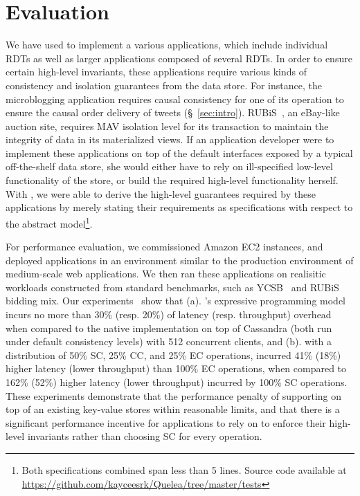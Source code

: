 \section{Evaluation}
\label{sec:evaluation}

We have used \name to implement a various applications, which include
individual RDTs as well as larger applications composed of several
RDTs. In order to ensure certain high-level invariants, these
applications require various kinds of consistency and isolation
guarantees from the data store. For instance, the microblogging
application requires causal consistency for one of its 
operation to ensure the causal order delivery of tweets
(\S~\ref{sec:intro}). RUBiS~\cite{RUBiS}, an eBay-like auction site,
requires MAV isolation level for its  transaction to
maintain the integrity of data in its materialized views. If an
application developer were to implement these applications on top of
the default interfaces exposed by a typical off-the-shelf data store,
she would either have to rely on ill-specified low-level functionality
of the store, or build the required high-level functionality herself.
With \name, we were able to derive the high-level guarantees required
by these applications by merely stating their requirements as
specifications with respect to the abstract model\footnote{Both
specifications combined span less than 5 lines. Source code available
at \url{https://github.com/kayceesrk/Quelea/tree/master/tests}}.

For performance evaluation, we commissioned Amazon EC2 instances, and
deployed \name applications in an environment similar to the
production environment of medium-scale web applications. We then ran
these applications on realisitic workloads constructed from standard
benchmarks, such as YCSB~\cite{YCSB} and RUBiS bidding mix. Our
experiments~\cite{pldi15} show that (a). \name's expressive
programming model incurs no more than 30\% (resp. 20\%) of latency
(resp. throughput) overhead when compared to the native implementation
on top of Cassandra (both run under default consistency levels) with
512 concurrent clients, and (b). with a distribution of 50\% SC, 25\%
CC, and 25\% EC operations, \name incurred 41\% (18\%) higher latency
(lower throughput) than 100\% EC operations, when compared to 162\%
(52\%) higher latency (lower throughput) incurred by 100\% SC
operations. These experiments demonstrate that the performance penalty
of supporting \name on top of an existing key-value stores within
reasonable limits, and that there is a significant performance
incentive for applications to rely on \name to enforce their
high-level invariants rather than choosing SC for every operation.
